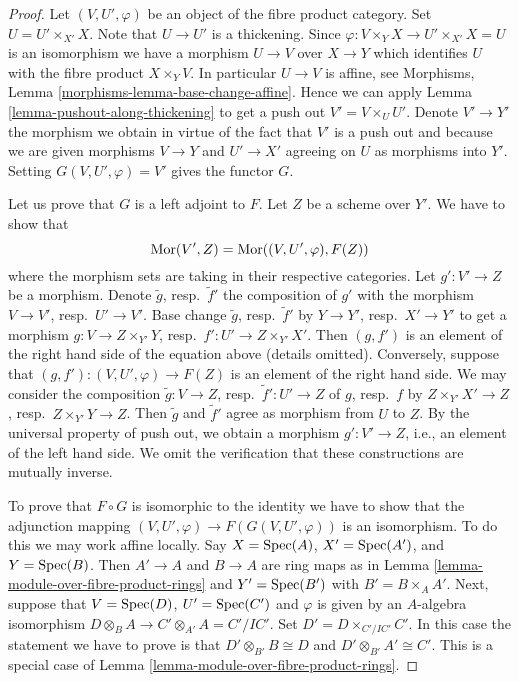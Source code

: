 \begin{proof}
Let $(V, U', \varphi)$ be an object of the fibre product category.
Set $U = U' \times_{X'} X$. Note that $U \to U'$ is a thickening.
Since $\varphi : V \times_Y X \to U' \times_{X'} X = U$ is an isomorphism
we have a morphism $U \to V$ over $X \to Y$ which identifies $U$ with
the fibre product $X \times_Y V$. In particular $U \to V$ is affine, see
Morphisms, Lemma \ref{morphisms-lemma-base-change-affine}.
Hence we can apply Lemma \ref{lemma-pushout-along-thickening}
to get a push out $V' = V \times_U U'$. Denote $V' \to Y'$ the morphism
we obtain in virtue of the fact that $V'$ is a push out and because
we are given morphisms $V \to Y$ and $U' \to X'$ agreeing on $U$
as morphisms into $Y'$. Setting $G(V, U', \varphi) = V'$
gives the functor $G$.

\medskip\noindent
Let us prove that $G$ is a left adjoint to $F$. Let $Z$ be a scheme
over $Y'$. We have to show that
$$
\mathop{\rm Mor}\nolimits(V', Z) = \mathop{\rm Mor}\nolimits((V, U', \varphi), F(Z))
$$
where the morphism sets are taking in their respective categories.
Let $g' : V' \to Z$ be a morphism. Denote $\tilde g$, resp.\ $\tilde f'$
the composition of $g'$ with the morphism $V \to V'$, resp.\ $U' \to V'$.
Base change $\tilde g$, resp.\ $\tilde f'$ by $Y \to Y'$, resp.\ $X' \to Y'$
to get a morphism $g : V \to Z \times_{Y'} Y$,
resp.\ $f' : U' \to Z \times_{Y'} X'$. Then $(g, f')$ is an element
of the right hand side of the equation above (details omitted).
Conversely, suppose that $(g, f') : (V, U', \varphi) \to F(Z)$ is an
element of the right hand side.
We may consider the composition $\tilde g : V \to Z$,
resp.\ $\tilde f' : U' \to Z$ of $g$, resp.\ $f$ by
$Z \times_{Y'} X' \to Z$, resp.\ $Z \times_{Y'} Y \to Z$.
Then $\tilde g$ and $\tilde f'$ agree as morphism from $U$ to $Z$.
By the universal property of push out, we obtain a morphism
$g' : V' \to Z$, i.e., an element of the left hand side.
We omit the verification that these constructions are mutually inverse.

\medskip\noindent
To prove that $F \circ G$ is isomorphic to the identity we have to
show that the adjunction mapping
$(V, U', \varphi) \to F(G(V, U', \varphi))$ is an isomorphism.
To do this we may work affine locally. Say $X = \mathop{\rm Spec}(A)$, $X' = \mathop{\rm Spec}(A')$,
and $Y = \mathop{\rm Spec}(B)$. Then $A' \to A$ and $B \to A$ are ring maps as in
Lemma \ref{lemma-module-over-fibre-product-rings} and
$Y' = \mathop{\rm Spec}(B')$ with $B' = B \times_A A'$. Next, suppose that
$V = \mathop{\rm Spec}(D)$, $U' = \mathop{\rm Spec}(C')$ and $\varphi$ is given by an
$A$-algebra isomorphism $D \otimes_B A \to C' \otimes_{A'} A = C'/IC'$.
Set $D' = D \times_{C'/IC'} C'$. In this case the statement we have to
prove is that $D' \otimes_{B'} B \cong D$ and $D' \otimes_{B'} A' \cong C'$.
This is a special case of
Lemma \ref{lemma-module-over-fibre-product-rings}.
\end{proof}

